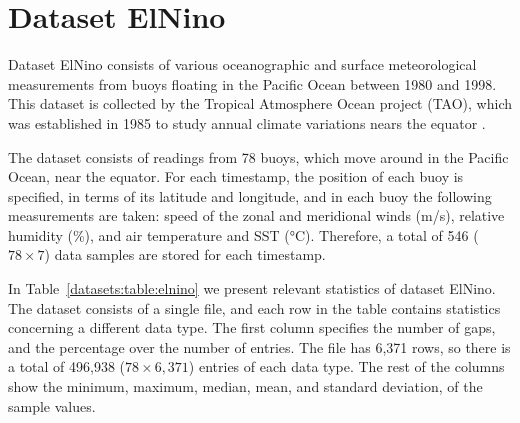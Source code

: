 
\vspace{-15pt}
\section{Dataset ElNino}
\label{datasets:elnino}

Dataset ElNino \cite{dataset:elnino} consists of various oceanographic and surface meteorological measurements from buoys floating in the Pacific Ocean between 1980 and 1998. This dataset is collected by the Tropical Atmosphere Ocean project (TAO), which was established in 1985 to study annual climate variations nears the equator \cite{dataset:tao}.


The dataset consists of readings from 78 buoys, which move around in the Pacific Ocean, near the equator. For each timestamp, the position of each buoy is specified, in terms of its latitude and longitude, and in each buoy the following measurements are taken: speed of the zonal and meridional winds (m/s), relative humidity (\%), and air temperature and SST (°C). Therefore, a total of 546 ($78\times7$) data samples are stored for each timestamp.


In Table~\ref{datasets:table:elnino} we present relevant statistics of dataset ElNino. The dataset consists of a single file, and each row in the table contains statistics concerning a different data type. The first column specifies the number of gaps, and the percentage over the number of entries. The file has 6,371 rows, so there is a total of 496,938 ($78\times6,371$) entries of each data type. The rest of the columns show the minimum, maximum, median, mean, and standard deviation, of the sample values.




